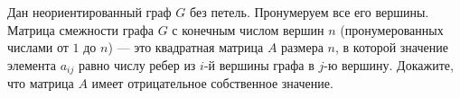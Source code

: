 \documentclass{article}
\begin{document}
Дан неориентированный граф $G$ без петель. Пронумеруем все его вершины. Матрица смежности графа $G$ с конечным числом вершин $n$ (пронумерованных числами от $1$ до $n$) --- это квадратная матрица $A$ размера $n$, в которой значение элемента $a_{ij}$ равно числу ребер из $i$-й вершины графа в $j$-ю вершину. Докажите, что матрица $A$ имеет отрицательное собственное значение.
\end{document}
